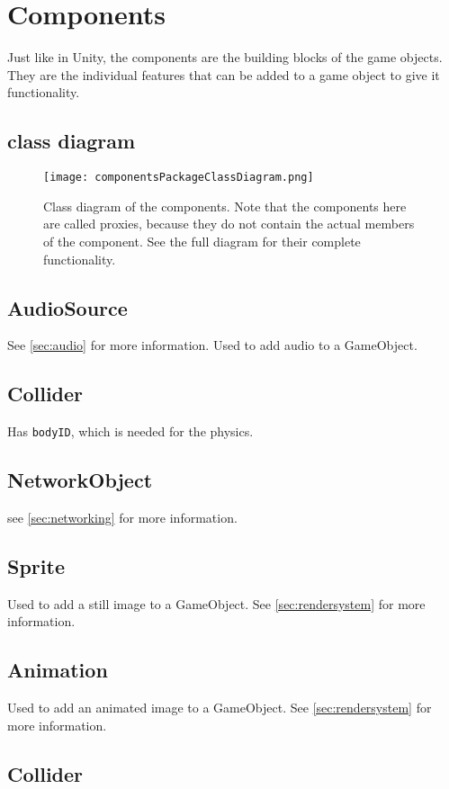 \section{Components}
\label{sec:components}
Just like in Unity, the components are the building blocks of the game objects.
They are the individual features that can be added to a game object to give it functionality.

\subsection{class diagram}
\begin{figure}[H]
    \texttt{[image: componentsPackageClassDiagram.png]}
    \caption{Class diagram of the components. Note that the components here are called proxies, because they do not contain the actual members of the component. See the full diagram for their complete functionality.}
    \label{fig:components}
\end{figure}

\subsection{AudioSource}
See \autoref{sec:audio} for more information.
Used to add audio to a GameObject.

\subsection{Collider}
Has \texttt{bodyID}, which is needed for the physics.

\subsection{NetworkObject}
see \autoref{sec:networking} for more information.

\subsection{Sprite}
Used to add a still image to a GameObject.
See \autoref{sec:rendersystem} for more information.

\subsection{Animation}
Used to add an animated image to a GameObject.
See \autoref{sec:rendersystem} for more information.

\subsection{Collider}

